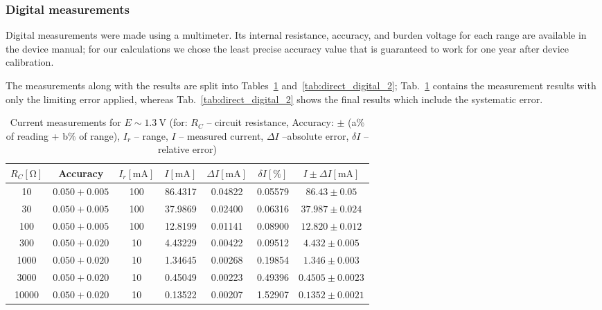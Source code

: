 \subsubsection{Digital measurements}

Digital measurements were made using a multimeter. Its internal resistance, accuracy, and burden voltage for each range are available in the device manual; for our calculations we chose the least precise accuracy value that is guaranteed to work for one year after device calibration.

The measurements along with the results are split into Tables~\ref{tab:direct_digital_1} and~\ref{tab:direct_digital_2}; Tab.~\ref{tab:direct_digital_1} contains the measurement results with only the limiting error applied, whereas Tab.~\ref{tab:direct_digital_2} shows the final results which include the systematic error.

\begin{table}[H]
	\centering
	\begin{tabular}{ c | c | c | c | c | c | c }
		$R_C [\unit{\ohm}]$& Accuracy & $I_r [\unit{\milli\ampere}]$ & $I [\unit{\milli\ampere}]$ & $\Delta I [\unit{\milli\ampere}]$ & $\delta I [\unit{\percent}]$ & $I \pm \Delta I [\unit{\milli\ampere}]$\\
		\hline
		10	& $0.050 + 0.005$	& 100	& 86.4317	 & 0.04822	& 0.05579	& $86.43 \pm 0.05$\\
		30 & $	0.050+0.005$	& 100	& 37.9869	& 0.02400	& 0.06316	&$ 37.987 \pm 0.024$\\
		100	& $0.050+0.005$	& 100	& 12.8199	& 0.01141&	0.08900	 &$12.820 \pm 0.012$\\
		300	&$0.050+0.020$&	10&	4.43229	&0.00422&	0.09512&	$4.432 \pm 0.005$\\
		1000&	$0.050+0.020$	&10	&1.34645&	0.00268	&0.19854&	$1.346 \pm 0.003$\\
		3000&	$0.050+0.020$&	10	&0.45049&	0.00223	&0.49396&	$0.4505 \pm0.0023$\\
		10000	&$0.050+0.020$&	10&	0.13522	&0.00207&	1.52907&	$0.1352 \pm 0.0021$\\
	\end{tabular}
	\caption{Current measurements for $E\sim\SI{1.3}{\volt}$ (for: $R_C$ -- circuit resistance, Accuracy: $\pm$ (a$\unit{\percent}$ of reading + b$\unit{\percent}$ of range), $I_r$ -- range, $I$ -- measured current, $\Delta I$ --absolute error, $\delta I$ -- relative error)}
	\label{tab:direct_digital_1}
\end{table}

